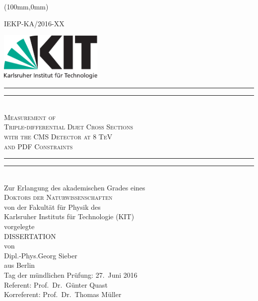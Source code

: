 \begin{titlepage}
    \begin{center}
        \begin{textblock*}{5cm}(100mm,0mm)
            \begin{flushright}
                \small
                IEKP-KA/2016-XX
            \end{flushright}
        \end{textblock*}
        \includegraphics[width=5.0cm]{figures/Kitlogo_de_cmyk}
        \vspace*{2cm}

        \vspace*{\baselineskip}
        \rule{\textwidth}{1.6pt}\vspace*{-\baselineskip}\vspace*{2pt}
        \rule{\textwidth}{0.4pt}\\[\baselineskip]
        \LARGE{\textsc{Measurement of\\
            Triple-differential Dijet Cross Sections\\
            with the CMS Detector at 8 TeV\\
            and PDF Constraints}}\\
        \rule{\textwidth}{0.4pt}\vspace*{-\baselineskip}\vspace{3.2pt}
        \rule{\textwidth}{1.6pt}\\[\baselineskip]
        \vspace{6ex}
        \large Zur Erlangung des akademischen Grades eines\\[2.5ex]
        \textsc{Doktors der Naturwissenschaften}\\[2.5ex]
            von der Fakult\"at f\"ur Physik des\\
        Karlsruher Instituts f\"ur Technologie (KIT)\\ 
        vorgelegte\\
        \vspace{2.5ex}
        DISSERTATION\\
        \vspace{2.5ex}
        von\\
        \vspace{2ex}
        Dipl.-Phys.\;Georg Sieber\\
        aus Berlin\\

\vspace{\fill}
Tag der mündlichen Prüfung: 27.\ Juni 2016\\[1.5ex]
Referent: Prof.\ Dr.\ Günter Quast\\[0.5ex]
Korreferent: Prof.\ Dr.\ Thomas Müller
    \end{center}
\end{titlepage}
\cleardoublepage
